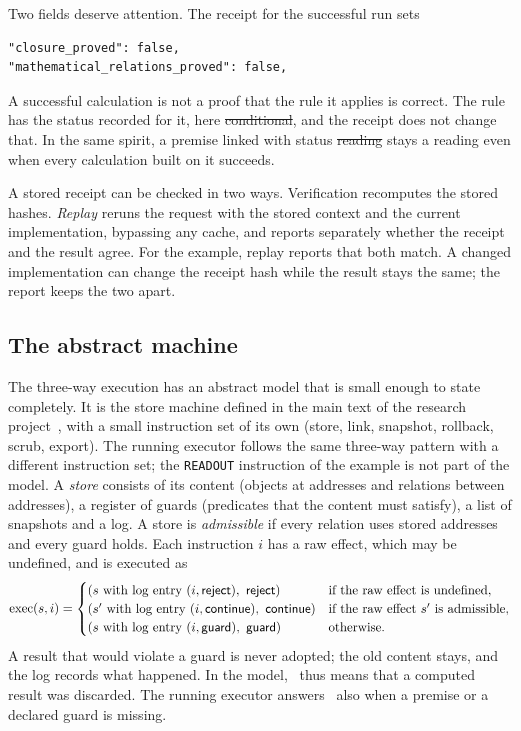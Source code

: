 Two fields deserve attention. The receipt for the successful run sets
\begin{lstlisting}
"closure_proved": false,
"mathematical_relations_proved": false,
\end{lstlisting}
A successful calculation is not a proof that the rule it applies is correct. The rule has the status recorded for it, here
\st{conditional}, and the receipt does not change that. In the same spirit, a premise linked with status \st{reading} stays a reading
even when every calculation built on it succeeds.

A stored receipt can be checked in two ways. Verification recomputes the stored hashes. \emph{Replay} reruns the request with the stored
context and the current implementation, bypassing any cache, and reports separately whether the receipt and the result agree. For the
example, replay reports that both match. A changed implementation can change the receipt hash while the result stays the same; the
report keeps the two apart.

\subsection{The abstract machine}

The three-way execution has an abstract model that is small enough to state completely. It is the store machine defined in the main
text of the research project~\cite{repo}, with a small instruction set of its own (store, link, snapshot, rollback, scrub, export). The
running executor follows the same three-way pattern with a different instruction set; the \texttt{READOUT} instruction of the example
is not part of the model. A \emph{store} consists of its content (objects at
addresses and relations between addresses), a register of guards (predicates that the content must satisfy), a list of snapshots and a
log. A store is \emph{admissible} if every relation uses stored addresses and every guard holds. Each instruction $i$ has a raw effect,
which may be undefined, and is executed as
\[
\mathrm{exec}(s,i)=\begin{cases}
(s \text{ with log entry } (i,\textsf{reject}),\ \textsf{reject}) & \text{if the raw effect is undefined},\\
(s' \text{ with log entry } (i,\textsf{continue}),\ \textsf{continue}) & \text{if the raw effect } s' \text{ is admissible},\\
(s \text{ with log entry } (i,\textsf{guard}),\ \textsf{guard}) & \text{otherwise.}
\end{cases}
\]
A result that would violate a guard is never adopted; the old content stays, and the log records what happened. In the model, \guard\
thus means that a computed result was discarded. The running executor answers \guard\ also when a premise or a declared guard is
missing.

